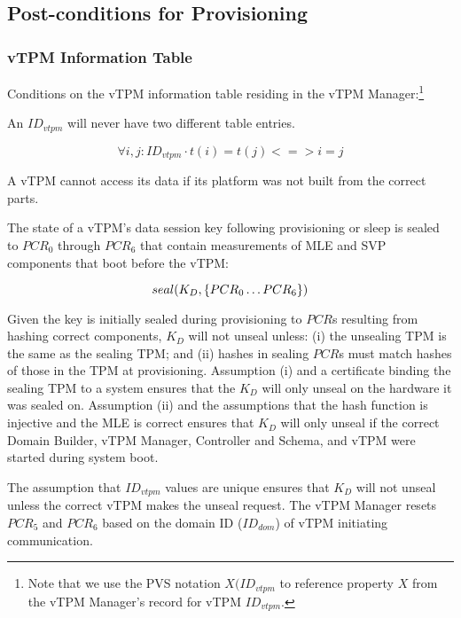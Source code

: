 \documentclass[10pt]{article}
\begin{document}
\subsection*{Post-conditions for Provisioning}

\subsubsection*{vTPM Information Table}

Conditions on the vTPM information table residing in the vTPM
Manager:\footnote{Note that we use the PVS notation $X(ID_{vtpm}$ to
  reference property $X$ from the vTPM Manager's record for vTPM $ID_{vtpm}$.}


\begin{invariant}
  An $ID_{vtpm}$ will never have two different table entries.

\[\forall i,j:ID_{vtpm} \cdot t(i)=t(j) <=> i=j\]

\end{invariant}

\begin{invariant}
  A vTPM cannot access its data if its platform was not built from the
  correct parts.

  The state of a vTPM's data session key following provisioning or
  sleep is sealed to $PCR_0$ through $PCR_6$ that contain measurements
  of MLE and SVP components that boot before the vTPM:

  \[seal(K_D,\{PCR_0\ldots PCR_6\})\]

  Given the key is initially sealed during provisioning to $PCR$s
  resulting from hashing correct components, $K_D$ will not unseal
  unless: (i) the unsealing TPM is the same as the sealing TPM; and
  (ii) hashes in sealing $PCR$s must match hashes of those in the TPM
  at provisioning.  Assumption (i) and a certificate binding the
  sealing TPM to a system ensures that the $K_D$ will only unseal on
  the hardware it was sealed on.  Assumption (ii) and the assumptions
  that the hash function is injective and the MLE is correct ensures
  that $K_D$ will only unseal if the correct Domain Builder, vTPM
  Manager, Controller and Schema, and vTPM were started during system
  boot.

  The assumption that $ID_{vtpm}$ values are unique ensures that $K_D$
  will not unseal unless the correct vTPM makes the unseal request.
  The vTPM Manager resets $PCR_5$ and $PCR_6$ based on the domain ID
  ($ID_{dom}$) of vTPM initiating communication.
\end{invariant}
\end{document}

